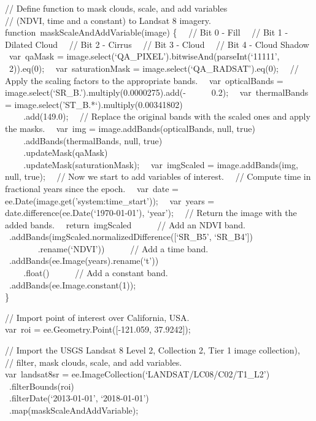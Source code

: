 \documentclass[
  letterpaper,
  DIV=11,
  numbers=noendperiod]{scrreprt}
\begin{document}
// Define function to mask clouds, scale, and add variables\\
// (NDVI, time and a constant) to Landsat 8 imagery.\\
function~maskScaleAndAddVariable(image) \{~ ~// Bit 0 - Fill~ ~// Bit 1
- Dilated Cloud~ ~// Bit 2 - Cirrus~ ~// Bit 3 - Cloud~ ~// Bit 4 -
Cloud Shadow~ ~var~qaMask =
image.select(`QA\_PIXEL').bitwiseAnd(parseInt(`11111',~ ~ ~ ~2)).eq(0);~
~var~saturationMask = image.select(`QA\_RADSAT').eq(0);~ ~// Apply the
scaling factors to the appropriate bands.~ ~var~opticalBands =
image.select(`SR\_B.').multiply(0.0000275).add(-~ ~ ~ ~0.2);~
~var~thermalBands = image.select('ST\_B.*`).multiply(0.00341802)\\
\hspace*{0.333em} ~ ~ ~.add(149.0);~ ~// Replace the original bands with
the scaled ones and apply the masks.~ ~var~img =
image.addBands(opticalBands, null, true)\\
\hspace*{0.333em} ~ ~ ~.addBands(thermalBands, null, true)\\
\hspace*{0.333em} ~ ~ ~.updateMask(qaMask)\\
\hspace*{0.333em} ~ ~ ~.updateMask(saturationMask);~ ~var~imgScaled =
image.addBands(img, null, true);~ ~// Now we start to add variables of
interest.~ ~// Compute time in fractional years since the epoch.~
~var~date = ee.Date(image.get('system:time\_start'));~ ~var~years =
date.difference(ee.Date(`1970-01-01'), `year');~ ~// Return the image
with the added bands.~ ~return~imgScaled~ ~ ~ ~// Add an NDVI band.~ ~ ~
~.addBands(imgScaled.normalizedDifference({[}`SR\_B5', `SR\_B4'{]})\\
\hspace*{0.333em} ~ ~ ~ ~ ~.rename(`NDVI'))~ ~ ~ ~// Add a time band.~ ~
~ ~.addBands(ee.Image(years).rename(`t'))\\
\hspace*{0.333em} ~ ~ ~.float()~ ~ ~ ~// Add a constant band.~ ~ ~
~.addBands(ee.Image.constant(1));\\
\}

// Import point of interest over California, USA.\\
var~roi = ee.Geometry.Point({[}-121.059, 37.9242{]});

// Import the USGS Landsat 8 Level 2, Collection 2, Tier 1 image
collection),\\
// filter, mask clouds, scale, and add variables.\\
var~landsat8sr = ee.ImageCollection(`LANDSAT/LC08/C02/T1\_L2')\\
\hspace*{0.333em} ~.filterBounds(roi)\\
\hspace*{0.333em} ~.filterDate(`2013-01-01', `2018-01-01')\\
\hspace*{0.333em} ~.map(maskScaleAndAddVariable);
\end{document}
